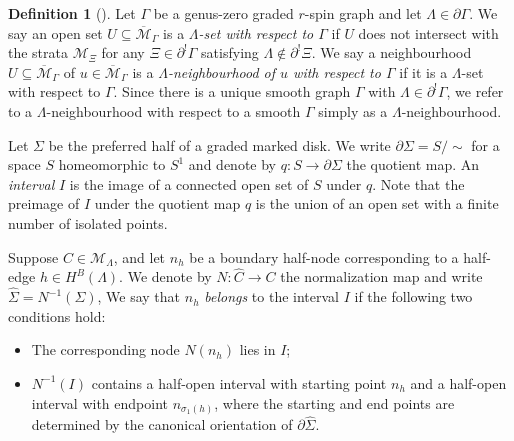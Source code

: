 \documentclass[11pt]{amsart}
\theoremstyle{definition}
\newtheorem{definition}[dummy]{Definition}
\theoremstyle{remark}
\newcommand{\<}{\left<}
\renewcommand{\>}{\right>}
\numberwithin{equation}{section}
\def\Mbar{{\overline{\mathcal M}}}
\begin{document}
\begin{definition}[{\cite[Definition 3.4]{BCT2}}]\label{def positive neighbourhoods}
Let $\Gamma$ be a genus-zero graded $r$-spin graph and let $\Lambda \in \partial\Gamma$.  
We say an open set $U\subseteq \Mbar_\Gamma$ is a \textit{$\Lambda$-set with respect to $\Gamma$} if $U$ does not intersect with the strata ${\mathcal{M}}_\Xi$  for any $\Xi \in\partial^! \Gamma $ satisfying $\Lambda\notin \partial^!\Xi$.
We say a neighbourhood $U\subseteq\Mbar_\Gamma$ of $u\in\Mbar_\Gamma$ is a \textit{$\Lambda$-neighbourhood of $u$ with respect to $\Gamma$} if it is a $\Lambda$-set with respect to $\Gamma$.  Since there is a unique smooth graph $\Gamma$ with $\Lambda\in\partial^!\Gamma$, we refer to a $\Lambda$-neighbourhood with respect to a smooth $\Gamma$ simply as a $\Lambda$-neighbourhood.

Let $\Sigma$ be the preferred half of a graded marked disk. We write $\partial \Sigma = S/\sim$ for a space $S$ homeomorphic to $S^1$ and denote by $q\colon S \to \partial \Sigma$ the quotient map. An \emph{interval} $I$ is the image of a connected open set of $S$ under $q$. Note that the preimage of $I$ under the quotient map $q$ is the union of an open set with a finite number of isolated points.

Suppose $C\in{\mathcal{M}}_\Lambda$, and let $n_h$ be a boundary half-node corresponding to a half-edge $h\in H^B(\Lambda)$. We denote by $N: \widehat{C} \to C$ the normalization map and write $\widehat{\Sigma} = N^{-1}(\Sigma)$, We say that $n_h$ \textit{belongs} to the interval $I$ if the following two conditions %
hold:
\begin{itemize}
    \item The corresponding %
node $N(n_{h})$ lies in $I$;
    \item  $N^{-1}(I)$ contains a half-open interval with starting point $n_h$ and a half-open interval with endpoint $n_{\sigma_1(h)}$, where the starting and end points are determined by the canonical orientation of $\partial\widehat{\Sigma}$.
\end{itemize}


\end{definition}
\end{document}
